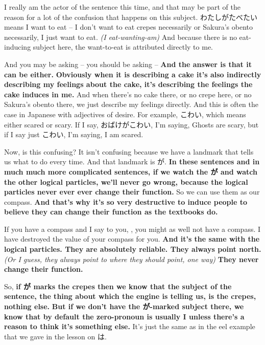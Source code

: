 {}

I really am the actor of the sentence this time, and that may be part of the reason for a lot of the confusion that happens on this subject. わたしがたべたい means I want to eat -- I don't want to eat crepes necessarily or Sakura's obento necessarily, I just want to eat. {\em (I eat-wanting-am)} And because there is no eat-inducing subject here, the want-to-eat is attributed directly to me.

And you may be asking -- you should be asking --  {\bf And the answer is that it can be either.} {\bf Obviously when it is describing a cake it's also indirectly describing my feelings about the cake, it's describing the feelings the cake induces in me.} And when there's no cake there, or no crepe here, or no Sakura's obento there, we just describe my feelings directly. And this is often the case in Japanese with adjectives of desire. For example, こわい, which means either scared or scary. If I say, おばけがこわい, I'm saying, Ghosts are scary, but if I say just こわい, I'm saying, I am scared.

{}

Now, is this confusing? It isn't confusing because we have a landmark that tells us what to do every time. And that landmark is が. {\bf In these sentences and in much much more complicated sentences, if we watch the が and watch the other logical particles, we'll never go wrong, because the logical particles never ever ever change their function.} So we can use them as our compass. {\bf And that's why it's so very destructive to induce people to believe they can change their function as the textbooks do.}

If you have a compass and I say to you, , you might as well not have a compass. I have destroyed the value of your compass for you. {\bf And it's the same with the logical particles. They are absolutely reliable. They always point north.} {\em (Or I guess, they always point to where they should point, one way)} {\bf They never change their function.}

{}

So, {\bf if が marks the crepes then we know that the subject of the sentence, the thing about which the engine is telling us, is the crepes, nothing else.} {\bf But if we don't have the が-marked subject there, we know that by default the zero-pronoun is usually I unless there's a reason to think it's something else.} It's just the same as in the eel example that we gave in the lesson on は.

